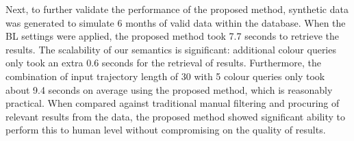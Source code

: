 Next, to further validate the performance of the proposed method, synthetic data was generated to simulate 6 months of valid data within the database. When the BL settings were applied, the proposed method took 7.7 seconds to retrieve the results. The scalability of our semantics is significant: additional colour queries only took an extra 0.6 seconds for the retrieval of results. Furthermore, the combination of input trajectory length of 30 with 5 colour queries only took about 9.4 seconds on average using the proposed method, which is reasonably practical. When compared against traditional manual filtering and procuring of relevant results from the data, the proposed method showed significant ability to perform this to human level without compromising on the quality of results. %
